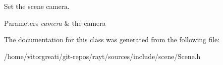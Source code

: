 Set the scene camera. 


\begin{DoxyParams}{Parameters}
{\em camera} & the camera \\
\hline
\end{DoxyParams}


The documentation for this class was generated from the following file\+:\begin{DoxyCompactItemize}
\item 
/home/vitorgreati/git-\/repos/rayt/sources/include/scene/Scene.\+h\end{DoxyCompactItemize}
